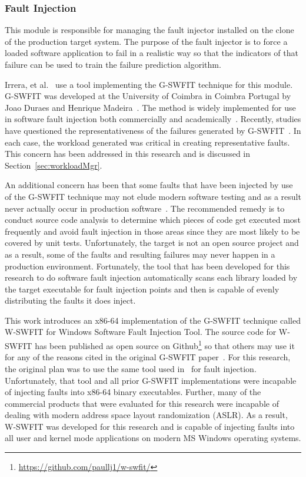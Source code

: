 \subsubsection{Fault Injection} \label{sec:faultInjectionMgr}
This module is responsible for managing the fault injector installed on the
clone of the production target system.  The purpose of the fault injector is to
force a loaded software application to fail in a realistic way so that the
indicators of that failure can be used to train the failure prediction
algorithm.

Irrera, et al.~\cite{irrera2015} use a tool implementing the G-SWFIT technique
for this module.  G-SWFIT was developed at the University of Coimbra in Coimbra
Portugal by Joao Duraes and Henrique Madeira~\cite{gswfit}.  The method is
widely implemented for use in software fault injection both commercially and
academically~\cite{natella2010,irrera2014,cotroneo2012,umadevi2015}.  Recently,
studies have questioned the representativeness of the failures generated by
G-SWFIT~\cite{kikuchi2014}.  In each case, the workload generated was critical
in creating representative faults.  This concern has been addressed in this
research and is discussed in Section~\ref{sec:workloadMgr}.

An additional concern has been that some faults that have been injected by use
of the G-SWFIT technique may not elude modern software testing and as a result
never actually occur in production software~\cite{natella2010}.  The
recommended remedy is to conduct source code analysis to determine which
pieces of code get executed most frequently and avoid fault injection in those
areas since they are most likely to be covered by unit tests.  Unfortunately,
the target is not an open source project and as a result, some of the faults
and resulting failures may never happen in a production environment.
Fortunately, the tool that has been developed for this research to do software
fault injection automatically scans each library loaded by the target
executable for fault injection points and then is capable of evenly
distributing the faults it does inject.

This work introduces an x86-64 implementation of the G-SWFIT technique called
W-SWFIT for Windows Software Fault Injection Tool.  The source code for W-SWFIT
has been published as open source on
Github\footnote{\url{https://github.com/paullj1/w-swfit/}} so that others may
use it for any of the reasons cited in the original G-SWFIT
paper~\cite{gswfit}.  For this research, the original plan was to use the same
tool used in~\cite{irrera2015} for fault injection.  Unfortunately, that tool
and all prior G-SWFIT implementations were incapable of injecting faults into
x86-64 binary executables.  Further, many of the commercial products that were
evaluated for this research were incapable of dealing with modern address space
layout randomization (ASLR).  As a result, W-SWFIT was developed for this
research and is capable of injecting faults into all user and kernel mode
applications on modern MS Windows operating systems.  

